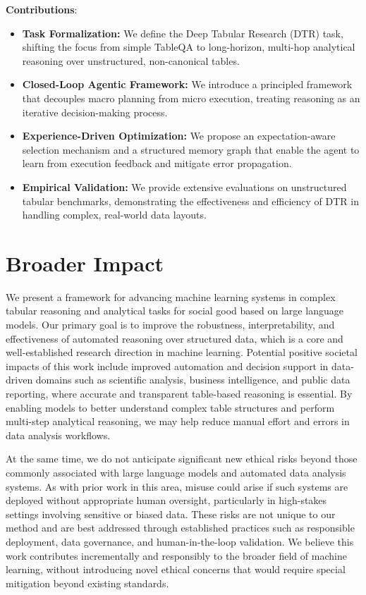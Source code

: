 \documentclass{article}
\theoremstyle{plain}
\theoremstyle{definition}
\theoremstyle{remark}
\begin{document}
\textbf{Contributions}:
\begin{itemize}[leftmargin=*] 
\item \textbf{Task Formalization:} We define the Deep Tabular Research (DTR) task, shifting the focus from simple TableQA to long-horizon, multi-hop analytical reasoning over unstructured, non-canonical tables. 
\item \textbf{Closed-Loop Agentic Framework:} We introduce a principled framework that decouples macro planning from micro execution, treating reasoning as an iterative decision-making process. 
\item \textbf{Experience-Driven Optimization:} We propose an expectation-aware selection mechanism and a structured memory graph that enable the agent to learn from execution feedback and mitigate error propagation. 
\item \textbf{Empirical Validation:} We provide extensive evaluations on unstructured tabular benchmarks, demonstrating the effectiveness and efficiency of DTR in handling complex, real-world data layouts. 
\end{itemize}







\section*{Broader Impact}

We present a framework for advancing machine learning systems in complex tabular reasoning and analytical tasks for social good based on large language models. Our primary goal is to improve the robustness, interpretability, and effectiveness of automated reasoning over structured data, which is a core and well-established research direction in machine learning. Potential positive societal impacts of this work include improved automation and decision support in data-driven domains such as scientific analysis, business intelligence, and public data reporting, where accurate and transparent table-based reasoning is essential. By enabling models to better understand complex table structures and perform multi-step analytical reasoning, we may help reduce manual effort and errors in data analysis workflows.

At the same time, we do not anticipate significant new ethical risks beyond those commonly associated with large language models and automated data analysis systems. As with prior work in this area, misuse could arise if such systems are deployed without appropriate human oversight, particularly in high-stakes settings involving sensitive or biased data. These risks are not unique to our method and are best addressed through established practices such as responsible deployment, data governance, and human-in-the-loop validation. We believe this work contributes incrementally and responsibly to the broader field of machine learning, without introducing novel ethical concerns that would require special mitigation beyond existing standards.



\newpage



\newpage
\appendix
\onecolumn

\end{document}
